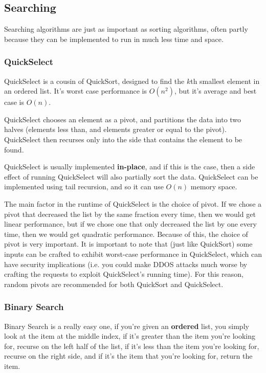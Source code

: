\subsection{Searching}

Searching algorithms are just as important as sorting algorithms, often partly
because they can be implemented to run in much less time and space.

\subsubsection{QuickSelect}
\label{QuickSelect}

QuickSelect is a cousin of QuickSort, designed to find the $k$th smallest
element in an ordered list. It's worst case performance is $O(n^2)$, but it's
average and best case is $O(n)$.

QuickSelect chooses an element as a pivot, and partitions the data into two
halves (elements less than, and elements greater or equal to the pivot).
QuickSelect then recurses only into the side that contains the element to be
found.

QuickSelect is usually implemented \textbf{in-place}, and if this is the case,
then a side effect of running QuickSelect will also partially sort the data.
QuickSelect can be implemented using tail recursion, and so it can use $O(n)$
memory space.

The main factor in the runtime of QuickSelect is the choice of pivot. If we
chose a pivot that decreased the list by the same fraction every time, then we
would get linear performance, but if we chose one that only decreased the list
by one every time, then we would get quadratic performance. Because of this, the
choice of pivot is very important. It is important to note that (just like
QuickSort) some inputs can be crafted to exhibit worst-case performance in
QuickSelect, which can have security implications (i.e. you could make DDOS
attacks much worse by crafting the requests to exploit QuickSelect's running
time). For this reason, random pivots are recommended for both QuickSort and
QuickSelect.

\subsubsection{Binary Search}

Binary Search is a really easy one, if you're given an \textbf{ordered} list,
you simply look at the item at the middle index, if it's greater than the item
you're looking for, recurse on the left half of the list, if it's less than the
item you're looking for, recurse on the right side, and if it's the item that
you're looking for, return the item.

